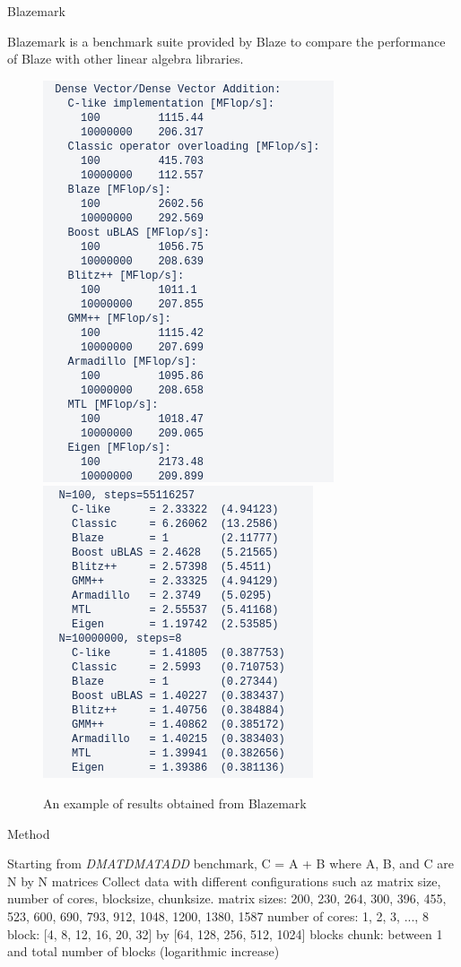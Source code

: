 \documentclass[10pt]{beamer}
\begin{document}
\begin{frame}{Blazemark}
	\begin{outline}
		Blazemark is a benchmark suite provided by Blaze to compare the performance of Blaze with other linear algebra libraries. 
		\begin{figure}
			\includegraphics[width=0.42\linewidth]{figures/blazemark_1.png}
			\hfill\includegraphics[width=0.41\linewidth]{figures/blazemark_2.png}
			\caption{An example of results obtained from Blazemark}	
		\end{figure}
	\end{outline}
\end{frame}

\begin{frame}{Method}
	\begin{outline}
	\1 Starting from \textit{DMATDMATADD} benchmark, C = A + B where A, B, and C are N by N matrices
	\1 Collect data with different configurations such az matrix size, number of cores, block\textunderscore size, chunk\textunderscore size. 
		\2matrix sizes: 200, 230, 264, 300, 396, 455, 523, 600, 690, 793, 912, 1048, 1200, 1380, 1587
		\2number of cores: 1, 2, 3, ..., 8
		\2block: {[4, 8, 12, 16, 20, 32]} by {[64, 128, 256, 512, 1024]} blocks
		\2chunk: between 1 and total number of blocks (logarithmic increase)
	\end{outline}
\end{frame}
\end{document}
